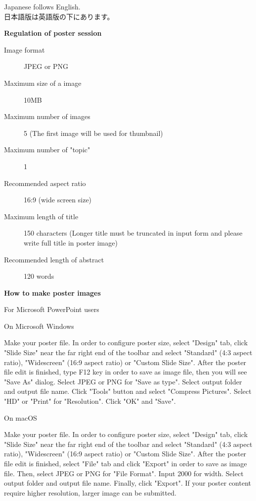 \documentclass[titlepage,10pt,a4paper,uplatex]{jsbook}
\newenvironment{content}{\begin{shaded}\vspace{-1em}\raggedright\ttfamily\footnotesize\setlength{\baselineskip}{1.4em}}{\end{shaded}\vspace{-1em}}
\renewcommand{\textbf}[1]{{\bfseries\sffamily#1}}
\begin{document}
\begin{content}
Japanese follows English.\\
日本語版は英語版の下にあります。

\textbf{\Large Regulation of poster session}

\begin{description}
\item[Image format] JPEG or PNG
\item[Maximum size of a image] 10MB
\item[Maximum number of images] 5 (The first image will be used for thumbnail)
\item[Maximum number of "topic"] 1
\item[Recommended aspect ratio] 16:9 (wide screen size)
\item[Maximum length of title] 150 characters (Longer title must be truncated in input form and please write full title in poster image)
\item[Recommended length of abstract] 120 words
\end{description}

\textbf{\Large How to make poster images}

{\Large For Microsoft PowerPoint users}

{\large On Microsoft Windows}

Make your poster file. In order to configure poster size, select "Design" tab, click "Slide Size" near the far right end of the toolbar and select "Standard" (4:3 aspect ratio), "Widescreen" (16:9 aspect ratio) or "Custom Slide Size". After the poster file edit is finished, type F12 key in order to save as image file, then you will see "Save As" dialog. Select JPEG or PNG for "Save as type". Select output folder and output file name. Click "Tools" button and select "Compress Pictures". Select "HD" or "Print" for "Resolution". Click "OK" and "Save".

{\large On macOS}

Make your poster file. In order to configure poster size, select "Design" tab, click "Slide Size" near the far right end of the toolbar and select "Standard" (4:3 aspect ratio), "Widescreen" (16:9 aspect ratio) or "Custom Slide Size". After the poster file edit is finished, select "File" tab and click "Export" in order to save as image file. Then, select JPEG or PNG for "File Format". Input 2000 for width. Select output folder and output file name. Finally, click "Export". If your poster content require higher resolution, larger image can be submitted.


\end{content}
\end{document}
